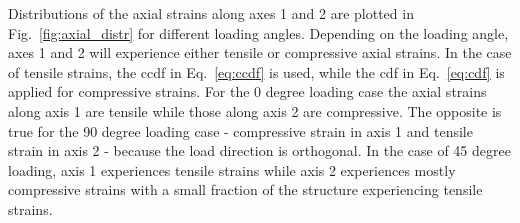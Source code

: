 \documentclass[10pt]{asme2ej}
\begin{document}
Distributions of the axial strains along axes 1 and 2 are plotted in Fig.\ \ref{fig:axial_distr} for different loading angles. Depending on the loading angle, axes 1 and 2 will experience either tensile or compressive axial strains. In the case of tensile strains, the ccdf in Eq.\ \eqref{eq:ccdf} is used, while the cdf in Eq.\ \eqref{eq:cdf} is applied for compressive strains. For the 0 degree loading case the axial strains along axis 1 are tensile while those along axis 2 are compressive. The opposite is true for the 90 degree loading case - compressive strain in axis 1 and tensile strain in axis 2 - because the load direction is orthogonal. In the case of 45 degree loading, axis 1 experiences tensile strains while axis 2 experiences mostly compressive strains with a small fraction of the structure experiencing tensile strains.
%
\end{document}

